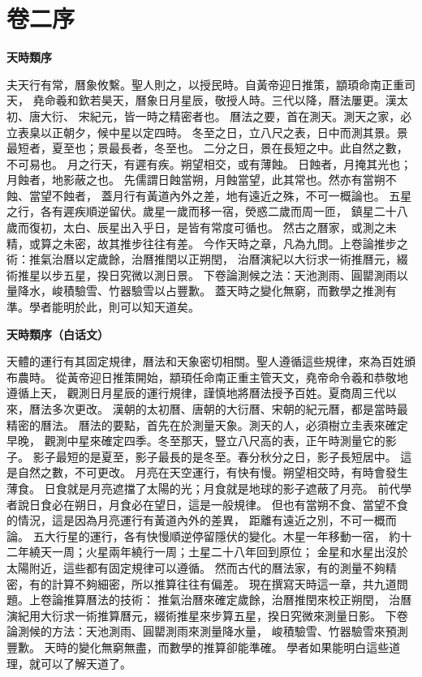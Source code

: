 \documentclass[11pt,a4paper]{book}
\newcommand{\origtext}[1]{{\color{origcolor}#1}}
\newcommand{\modtext}[1]{{\color{modcolor}#1}}
\begin{document}
\chapter*{卷二序}

\begin{center}
{\Large\bfseries\color{origcolor} 天時類序}
\end{center}
\vspace{0.5em}

\origtext{
夫天行有常，曆象攸繫。聖人則之，以授民時。自黃帝迎日推策，顓頊命南正重司天，
堯命羲和欽若昊天，曆象日月星辰，敬授人時。三代以降，曆法屢更。漢太初、唐大衍、
宋紀元，皆一時之精密者也。
曆法之要，首在測天。測天之家，必立表臬以正朝夕，候中星以定四時。
冬至之日，立八尺之表，日中而測其景。景最短者，夏至也；景最長者，冬至也。
二分之日，景在長短之中。此自然之數，不可易也。
月之行天，有遲有疾。朔望相交，或有薄蝕。
日蝕者，月掩其光也；月蝕者，地影蔽之也。
先儒謂日蝕當朔，月蝕當望，此其常也。然亦有當朔不蝕、當望不蝕者，
蓋月行有黃道內外之差，地有遠近之殊，不可一概論也。
五星之行，各有遲疾順逆留伏。歲星一歲而移一宿，熒惑二歲而周一匝，
鎮星二十八歲而復初，太白、辰星出入乎日，是皆有常度可循也。
然古之曆家，或測之未精，或算之未密，故其推步往往有差。
今作天時之章，凡為九問。上卷論推步之術：推氣治曆以定歲餘，治曆推閏以正朔閏，
治曆演紀以大衍求一術推曆元，綴術推星以步五星，揆日究微以測日景。
下卷論測候之法：天池測雨、圓罌測雨以量降水，峻積驗雪、竹器驗雪以占豐歉。
蓋天時之變化無窮，而數學之推測有準。學者能明於此，則可以知天道矣。}

\vspace{1cm}

\begin{center}
{\Large\bfseries\color{modcolor} 天時類序（白话文）}
\end{center}
\vspace{0.5em}

\modtext{
天體的運行有其固定規律，曆法和天象密切相關。聖人遵循這些規律，來為百姓頒布農時。
從黃帝迎日推策開始，顓頊任命南正重主管天文，堯帝命令羲和恭敬地遵循上天，
觀測日月星辰的運行規律，謹慎地將曆法授予百姓。夏商周三代以來，曆法多次更改。
漢朝的太初曆、唐朝的大衍曆、宋朝的紀元曆，都是當時最精密的曆法。
曆法的要點，首先在於測量天象。測天的人，必須樹立圭表來確定早晚，
觀測中星來確定四季。冬至那天，豎立八尺高的表，正午時測量它的影子。
影子最短的是夏至，影子最長的是冬至。春分秋分之日，影子長短居中。
這是自然之數，不可更改。
月亮在天空運行，有快有慢。朔望相交時，有時會發生薄食。
日食就是月亮遮擋了太陽的光；月食就是地球的影子遮蔽了月亮。
前代學者說日食必在朔日，月食必在望日，這是一般規律。
但也有當朔不食、當望不食的情況，這是因為月亮運行有黃道內外的差異，
距離有遠近之別，不可一概而論。
五大行星的運行，各有快慢順逆停留隱伏的變化。木星一年移動一宿，
約十二年繞天一周；火星兩年繞行一周；土星二十八年回到原位；
金星和水星出沒於太陽附近，這些都有固定規律可以遵循。
然而古代的曆法家，有的測量不夠精密，有的計算不夠細密，所以推算往往有偏差。
現在撰寫天時這一章，共九道問題。上卷論推算曆法的技術：
推氣治曆來確定歲餘，治曆推閏來校正朔閏，
治曆演紀用大衍求一術推算曆元，綴術推星來步算五星，揆日究微來測量日影。
下卷論測候的方法：天池測雨、圓罌測雨來測量降水量，
峻積驗雪、竹器驗雪來預測豐歉。
天時的變化無窮無盡，而數學的推算卻能準確。
學者如果能明白這些道理，就可以了解天道了。}
\end{document}
